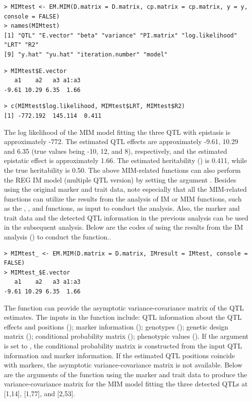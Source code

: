 \begin{verbatim}
> MIMtest <- EM.MIM(D.matrix = D.matrix, cp.matrix = cp.matrix, y = y, console = FALSE)
> names(MIMtest)
[1] "QTL" "E.vector" "beta" "variance" "PI.matrix" "log.likelihood" "LRT" "R2"              
[9] "y.hat" "yu.hat" "iteration.number" "model"
\end{verbatim}

\begin{verbatim}
> MIMtest$E.vector
   a1    a2   a3 a1:a3
-9.61 10.29 6.35  1.66
\end{verbatim}

\begin{verbatim}
> c(MIMtest$log.likelihood, MIMtest$LRT, MIMtest$R2)
[1] -772.192  145.114  0.411
\end{verbatim}

\noindent The log likelihood of the MIM model fitting the three QTL with epistasis is approximately -772. The estimated QTL effects are approximately -9.61, 10.29 and 6.35 (true values being -10, 12, and 8), respectively, and the estimated epistatic effect is approximately 1.66. The estimated heritability () is 0.411, while the true heritability is 0.50. The above MIM-related functions can also perform the REG IM model (multiple QTL version) by setting the argument . Besides using the original marker and trait data, note especially that all the MIM-related functions can utilize the results from the analysis of IM or MIM functions, such as the , , and  functions, as input to conduct the analysis. Also, the marker and trait data and the detected QTL information in the previous analysis can be used in the subsequent analysis. Below are the codes of using the results from the IM analysis () to conduct the  function..

\begin{verbatim}
> MIMtest_ <- EM.MIM(D.matrix = D.matrix, IMresult = IMtest, console = FALSE)
> MIMtest_$E.vector
   a1    a2   a3 a1:a3
-9.61 10.29 6.35  1.66
\end{verbatim}

The  function can provide the asymptotic variance-covariance matrix of the QTL estimates. The inputs in the  function include: QTL information about the QTL effects and positions (); marker information (); genotypes (); genetic design matrix (); conditional probability matrix (); phenotypic values (). If the argument  is set to , the conditional probability matrix is constructed from the input QTL information and marker information. If the estimated QTL positions coincide with markers, the asymptotic variance-covariance matrix is not available. Below are the arguments of the  function using the marker and trait data to produce the variance-covariance matrix for the MIM model fitting the three detected QTLs at [1,14], [1,77], and [2,53].

